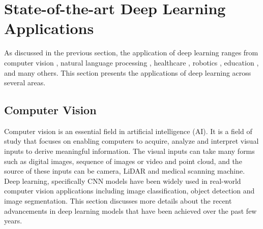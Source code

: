 \documentclass[preprint,12pt]{elsarticle}
\begin{document}
\section{State-of-the-art Deep Learning Applications}\label{sec4}
As discussed in the previous section, the application of deep learning ranges from computer vision \citep{Tan_2020_CVPR}, natural language processing \citep{Otter}, healthcare \citep{esteva2019guide}, robotics \citep{soori2023artificial}, education \citep{hernandez2019systematic}, and many others. This section presents the applications of deep learning across several areas.

\subsection{Computer Vision}
Computer vision is an essential field in artificial intelligence (AI). It is a field of study that focuses on enabling computers to acquire, analyze and interpret visual inputs to derive meaningful information. The visual inputs can take many forms such as digital images, sequence of images or video and point cloud, and the source of these inputs can be camera, LiDAR and medical scanning machine. Deep learning, specifically CNN models have been widely used in real-world computer vision applications including image classification, object detection and image segmentation. This section discusses more details about the recent advancements in deep learning models that have been achieved over the past few years.
\end{document}
